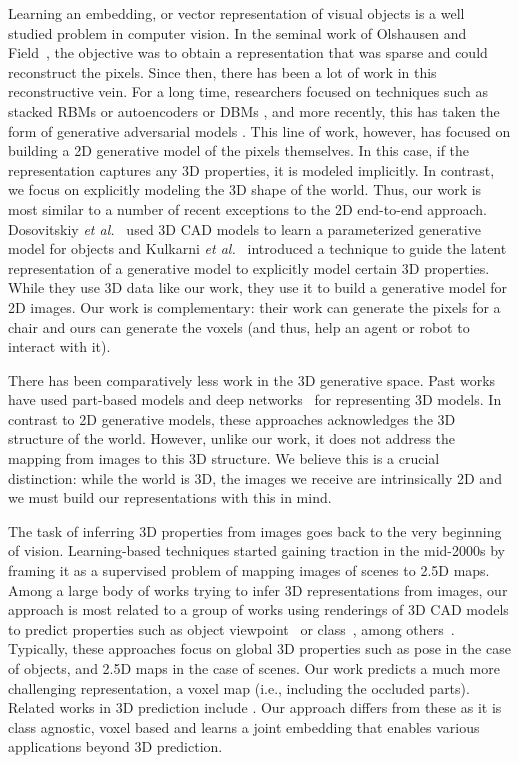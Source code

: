 \documentclass[runningheads]{llncs}
\newcommand{\etal}[0]{\textit{et al.\ }}
\begin{document}
Learning an embedding, or vector representation 
of visual objects 
is a well studied problem 
in computer vision. In the seminal work of Olshausen and
Field~\cite{Olshausen}, the objective was to obtain 
a representation that was sparse
and could reconstruct the pixels. Since then, 
there has been a 
lot of
work in this reconstructive vein. 
For a long time, researchers focused on 
techniques such as stacked RBMs or autoencoders
\cite{HintonSalakhutdinov2006b,Vincent:2010} 
or DBMs \cite{SalHinton07}, and
more recently, this has taken the form of generative adversarial models \cite{gen-adv-nets}.
This line of work, however, has focused on building a 2D generative model of the pixels themselves. 
In this case, if the representation captures any 3D properties, 
it is modeled implicitly.
In contrast, we focus on explicitly 
modeling the 3D shape of the world. Thus, our work is most similar to 
a number of recent exceptions to the 2D end-to-end approach.
Dosovitskiy \etal\cite{chair-brox} used 3D CAD
models to learn a parameterized generative model for objects and
Kulkarni \etal\cite{dcign} introduced a
technique to guide the latent representation of a generative model to
explicitly model certain 3D properties. While they use 3D data like our work, they use
it to build a generative model for 2D images. Our work is complementary:
their work can generate the pixels for a chair and ours
can generate the voxels (and thus, 
help an agent or robot to interact with it).

There has been comparatively less work in the 3D generative space.
Past works have
used part-based models \cite{Chaudhuri:2011,Kalogerakis:2012:ShapeSynthesis}
and deep networks~\cite{3dshapenet,yangyan_fpnn_arxiv16,maturana_iros_2015}
for representing 3D models.
In contrast to 2D generative
models, these approaches acknowledges the 3D structure of the world. However, unlike
our work, it does not address the mapping from images to this 3D structure. We believe this is a crucial
distinction: while the world is 3D, the images we receive are 
intrinsically 2D and we must build our representations with this in mind.

The task of inferring 3D properties from images goes back to the very
beginning of vision. Learning-based techniques started gaining traction
in the mid-2000s \cite{Hoiem-IJCV07,Saxena08} by framing it as a supervised
problem of mapping images of scenes to 2.5D maps. Among a large body of
works trying to infer 3D representations from images, our approach is
most related to a group of works using renderings of 3D CAD models to 
predict properties such as object viewpoint~\cite{Su_2015_ICCV} or
class~\cite{su15mvcnn}, among others~\cite{shapeFrom3D,object_pose_in_rgbd,PengSAS14}.
Typically, these approaches focus on global 3D properties such as pose in the
case of objects, and 2.5D maps in the case of scenes.
Our work predicts a much more challenging representation, a voxel map 
(i.e., including the occluded parts). 
Related works in 3D prediction include \cite{Kar15,wu2016single,choy_3dr2n2_arxiv16}.
Our approach differs from these as it is class agnostic, voxel based and learns
a joint embedding that enables various applications beyond 3D prediction.
\end{document}
